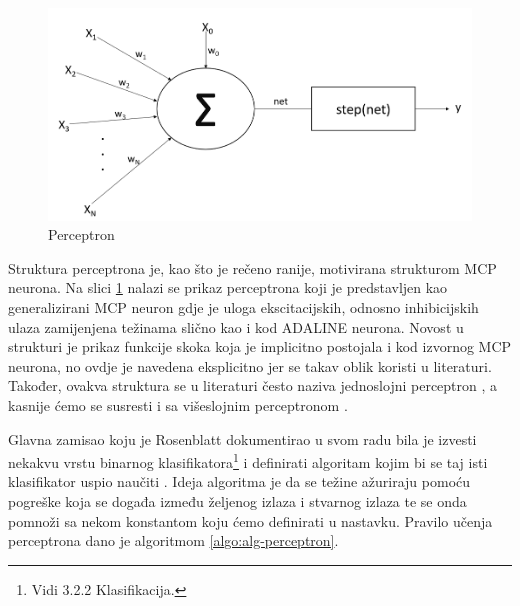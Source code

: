 \documentclass[times, utf8, zavrsni]{fer}
\begin{document}
\begin{figure}[H]
    \centering
    \includegraphics[scale=0.5]{img/step-neuron.png}
    \caption[Caption for LOF]{Perceptron\footnotemark}
    \label{fig:ai-neuron}
\end{figure}

Struktura perceptrona je, kao što je rečeno ranije, motivirana strukturom MCP neurona. Na slici \ref{fig:ai-neuron} nalazi se prikaz perceptrona koji je predstavljen kao generalizirani MCP neuron gdje je uloga ekscitacijskih, odnosno inhibicijskih ulaza zamijenjena težinama slično kao i kod ADALINE neurona. Novost u strukturi je prikaz funkcije skoka  koja je implicitno postojala i kod izvornog MCP neurona, no ovdje je navedena eksplicitno jer se takav oblik koristi u literaturi. Također, ovakva struktura se u literaturi često naziva jednoslojni perceptron , a kasnije ćemo se susresti i sa višeslojnim perceptronom .

Glavna zamisao koju je Rosenblatt dokumentirao u svom radu bila je izvesti nekakvu vrstu binarnog klasifikatora\footnote{Vidi 3.2.2 Klasifikacija.} i definirati algoritam kojim bi se taj isti klasifikator uspio naučiti \citep{rosenblatt}. Ideja algoritma je da se težine ažuriraju pomoću pogreške koja se događa između željenog izlaza i stvarnog izlaza te se onda pomnoži sa nekom konstantom koju ćemo definirati u nastavku. Pravilo učenja perceptrona dano je algoritmom \ref{algo:alg-perceptron}.
\end{document}
